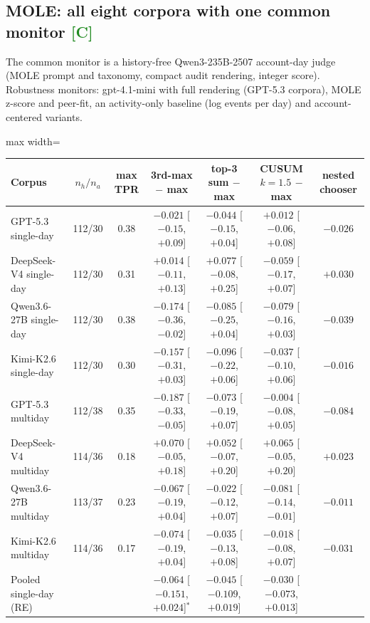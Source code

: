 \documentclass[11pt]{article}
\newcommand{\m}{\ensuremath{-}}
\newcommand{\tC}{\textsf{\scriptsize\textcolor{ForestGreen}{[C]}}\xspace}
\begin{document}
\subsection{MOLE: all eight corpora with one common monitor \tC}
The common monitor is a history-free Qwen3-235B-2507 account-day judge (MOLE prompt and taxonomy, compact audit rendering, integer score). Robustness monitors: gpt-4.1-mini with full rendering (GPT-5.3 corpora), MOLE z-score and peer-fit, an activity-only baseline (log events per day) and account-centered variants.

\begin{table}[!htbp]\centering\small
\begin{adjustbox}{max width=\linewidth}\begin{tabular}{@{}lcccccc@{}}
\toprule
Corpus & $n_h/n_a$ & max TPR & 3rd-max $-$ max & top-3 sum $-$ max & CUSUM $k{=}1.5$ $-$ max & nested chooser\\
\midrule
GPT-5.3 single-day & 112/30 & 0.38 & $\m0.021$ [$\m0.15$, $+0.09$] & $\m0.044$ [$\m0.15$, $+0.04$] & $+0.012$ [$\m0.06$, $+0.08$] & $\m0.026$\\
DeepSeek-V4 single-day & 112/30 & 0.31 & $+0.014$ [$\m0.11$, $+0.13$] & $+0.077$ [$\m0.08$, $+0.25$] & $\m0.059$ [$\m0.17$, $+0.07$] & $+0.030$\\
Qwen3.6-27B single-day & 112/30 & 0.38 & $\m0.174$ [$\m0.36$, $\m0.02$] & $\m0.085$ [$\m0.25$, $+0.04$] & $\m0.079$ [$\m0.16$, $+0.03$] & $\m0.039$\\
Kimi-K2.6 single-day & 112/30 & 0.30 & $\m0.157$ [$\m0.31$, $+0.03$] & $\m0.096$ [$\m0.22$, $+0.06$] & $\m0.037$ [$\m0.10$, $+0.06$] & $\m0.016$\\
GPT-5.3 multiday & 112/38 & 0.35 & $\m0.187$ [$\m0.33$, $\m0.05$] & $\m0.073$ [$\m0.19$, $+0.07$] & $\m0.004$ [$\m0.08$, $+0.05$] & $\m0.084$\\
DeepSeek-V4 multiday & 114/36 & 0.18 & $+0.070$ [$\m0.05$, $+0.18$] & $+0.052$ [$\m0.07$, $+0.20$] & $+0.065$ [$\m0.05$, $+0.20$] & $+0.023$\\
Qwen3.6-27B multiday & 113/37 & 0.23 & $\m0.067$ [$\m0.19$, $+0.04$] & $\m0.022$ [$\m0.12$, $+0.07$] & $\m0.081$ [$\m0.14$, $\m0.01$] & $\m0.011$\\
Kimi-K2.6 multiday & 114/36 & 0.17 & $\m0.074$ [$\m0.19$, $+0.04$] & $\m0.035$ [$\m0.13$, $+0.08$] & $\m0.018$ [$\m0.08$, $+0.07$] & $\m0.031$\\
\midrule
Pooled single-day (RE) & & & $\m0.064$ [$\m0.151$, $+0.024$]$^\ast$ & $\m0.045$ [$\m0.109$, $+0.019$] & $\m0.030$ [$\m0.073$, $+0.013$] & \\

\end{tabular}
\end{adjustbox}
\end{table}
\end{document}
